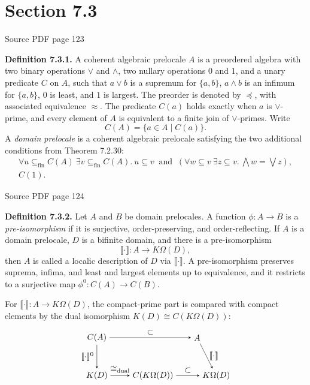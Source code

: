 \documentclass[11pt]{article}
\newcommand{\leanmarker}[2]{%
  \Needspace{3\baselineskip}%
  \marginnote{\hyperlink{#1}{\color{LeanTeal}\fbox{\scriptsize Lean}}}%
  \hypertarget{#1}{\textbf{#2.}}%
}
\newcommand{\sourcepage}[1]{\par\medskip\noindent\textcolor{SourceGray}{\scriptsize Source PDF page #1}\par\smallskip}
\begin{document}
\clearpage
\section*{Section 7.3}
\sourcepage{123}
\leanmarker{def-7-3-1}{Definition 7.3.1} A coherent algebraic prelocale \(A\) is a preordered algebra with two binary operations \(\vee\) and \(\wedge\), two nullary operations \(0\) and \(1\), and a unary predicate \(C\) on \(A\), such that \(a\vee b\) is a supremum for \(\{a,b\}\), \(a\wedge b\) is an infimum for \(\{a,b\}\), \(0\) is least, and \(1\) is largest. The preorder is denoted by \(\preceq\), with associated equivalence \(\approx\). The predicate \(C(a)\) holds exactly when \(a\) is \(\vee\)-prime, and every element of \(A\) is equivalent to a finite join of \(\vee\)-primes. Write
\[
  C(A)=\{a\in A\mid C(a)\}.
\]
A \emph{domain prelocale} is a coherent algebraic prelocale satisfying the two additional conditions from Theorem 7.2.30:
\[
\begin{array}{l}
\forall u\subseteq_{\mathrm{fin}}C(A)\ \exists v\subseteq_{\mathrm{fin}}C(A).\ u\subseteq v\ \text{ and }\ (\forall w\subseteq v\ \exists z\subseteq v.\ \bigwedge w=\bigvee z),\\[1mm]
C(1).
\end{array}
\]

\sourcepage{124}
\leanmarker{def-7-3-2}{Definition 7.3.2} Let \(A\) and \(B\) be domain prelocales. A function \(\phi:A\to B\) is a \emph{pre-isomorphism} if it is surjective, order-preserving, and order-reflecting. If \(A\) is a domain prelocale, \(D\) is a bifinite domain, and there is a pre-isomorphism
\[
  \llbracket\cdot\rrbracket:A\to K\Omega(D),
\]
then \(A\) is called a localic description of \(D\) via \(\llbracket\cdot\rrbracket\). A pre-isomorphism preserves suprema, infima, and least and largest elements up to equivalence, and it restricts to a surjective map \(\phi^0:C(A)\to C(B)\).

For \(\llbracket\cdot\rrbracket:A\to K\Omega(D)\), the compact-prime part is compared with compact elements by the dual isomorphism \(K(D)\cong C(K\Omega(D))\):
\[
\begin{tikzpicture}[baseline=(current bounding box.center), >=stealth]
  \node (CA) at (0,1.6) {$C(A)$};
  \node (A)  at (4.2,1.6) {$A$};
  \node (KD) at (0,0) {$K(D)$};
  \node (CKO) at (2.35,0) {$C(K\Omega(D))$};
  \node (KO) at (5.0,0) {$K\Omega(D)$};
  \draw[->] (CA) -- node[above] {$\subset$} (A);
  \draw[->] (CA) -- node[left] {$\llbracket\cdot\rrbracket^0$} (KD);
  \draw[->] (A) -- node[right] {$\llbracket\cdot\rrbracket$} (KO);
  \draw[->] (KD) -- node[above] {$\cong_{\mathrm{dual}}$} (CKO);
  \draw[->] (CKO) -- node[above] {$\subset$} (KO);
\end{tikzpicture}
\]
\end{document}
